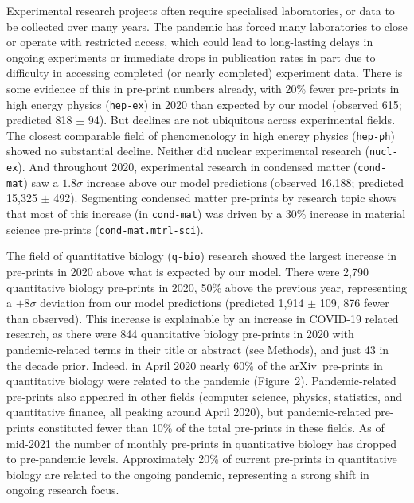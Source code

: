 \documentclass[a4paper,12pt]{article}
\newcommand{\arxiv}{arXiv}
\begin{document}
Experimental research projects often require specialised laboratories, or data to be collected over many years. The pandemic has forced many laboratories to close or operate with restricted access\cite{PhysicsWorld,ScienceMag}, which could lead to long-lasting delays in ongoing experiments or immediate drops in publication rates in part due to difficulty in accessing completed (or nearly completed) experiment data. There is some evidence of this in pre-print numbers already, with {20\%} fewer pre-prints in high energy physics (\texttt{hep-ex}) in 2020 than expected by our model (observed 615; predicted 818 $\pm$ 94). But declines are not ubiquitous across experimental fields. The closest comparable field of phenomenology in high energy physics (\texttt{hep-ph}) showed no substantial decline. Neither did nuclear experimental research (\texttt{nucl-ex}). And throughout 2020, experimental research in condensed matter (\texttt{cond-mat}) saw a $1.8\sigma$ increase above our model predictions (observed 16,188; predicted 15,325 $\pm$ 492). Segmenting condensed matter pre-prints by research topic shows that most of this increase (in \texttt{cond-mat}) was driven by a 30\% increase in material science pre-prints (\texttt{cond-mat.mtrl-sci}).




The field of quantitative biology (\texttt{q-bio}) research showed the largest increase in pre-prints in 2020 above what is expected by our model. There were {2,790} quantitative biology pre-prints in 2020, {50\%} above the previous year, representing a $+8\sigma$ deviation from our model predictions (predicted 1,914 $\pm$ 109, 876 fewer than observed). This increase is explainable by an increase in COVID-19 related research, as there were 844 quantitative biology pre-prints in 2020 with pandemic-related terms in their title or abstract (see Methods), and just 43 in the decade prior. Indeed, in {April 2020} nearly 60\% of the \arxiv\ pre-prints in quantitative biology were related to the pandemic (Figure~2). Pandemic-related pre-prints also appeared in other fields (computer science, physics, statistics, and quantitative finance, all peaking around {April 2020}), but pandemic-related pre-prints constituted fewer than 10\% of the total pre-prints in these fields. As of mid-2021 the number of monthly pre-prints in quantitative biology has dropped to pre-pandemic levels. Approximately 20\% of current pre-prints in quantitative biology are related to the ongoing pandemic, representing a strong shift in ongoing research focus.
 
\end{document}

